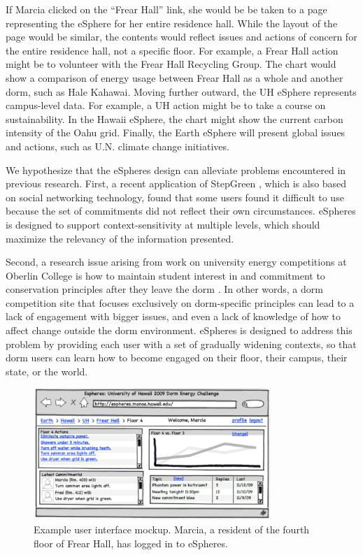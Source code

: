 If Marcia clicked on the ``Frear Hall'' link, she would be be taken to a
page representing the eSphere for her entire residence hall.  While the
layout of the page would be similar, the contents would reflect issues and
actions of concern for the entire residence hall, not a specific floor. For
example, a Frear Hall action might be to volunteer with the Frear Hall
Recycling Group.   The chart would show a comparison of energy usage
between Frear Hall as a whole and another dorm, such as Hale Kahawai. 
Moving further outward, the UH eSphere represents campus-level data. For
example, a UH action might be to take a course on sustainability.  
In the Hawaii eSphere, the chart might show the current carbon intensity of
the Oahu grid.  Finally, the Earth eSphere will present global issues and
actions, such as U.N. climate change initiatives. 

We hypothesize that the eSpheres design can alleviate problems
encountered in previous research.  First, a recent application of StepGreen
\cite{Grevet10}, which is also based on social networking technology, found
that some users found it difficult to use because the set of commitments
did not reflect their own circumstances.  eSpheres is designed to support
context-sensitivity at multiple levels, which should maximize the relevancy
of the information presented.

Second, a research issue arising from work on university energy
competitions at Oberlin College is how to maintain student interest in and
commitment to conservation principles after they leave the dorm
\cite{Peterson09}.  In other words, a dorm competition site that focuses
exclusively on dorm-specific principles can lead to a lack of engagement
with bigger issues, and even a lack of knowledge of how to affect change
outside the dorm environment.  eSpheres is designed to address this problem
by providing each user with a set of gradually widening contexts, so that
dorm users can learn how to become engaged on their floor, their campus,
their state, or the world.

\begin{figure}[th]
  \center
  \includegraphics[width=0.8\textwidth]{esphere-mockup.eps}
  \caption{\small Example user interface mockup. Marcia, a resident of
    the fourth floor of Frear Hall, has logged in to eSpheres.}
 \label{fig:esphere-mockup}
\end{figure} 

